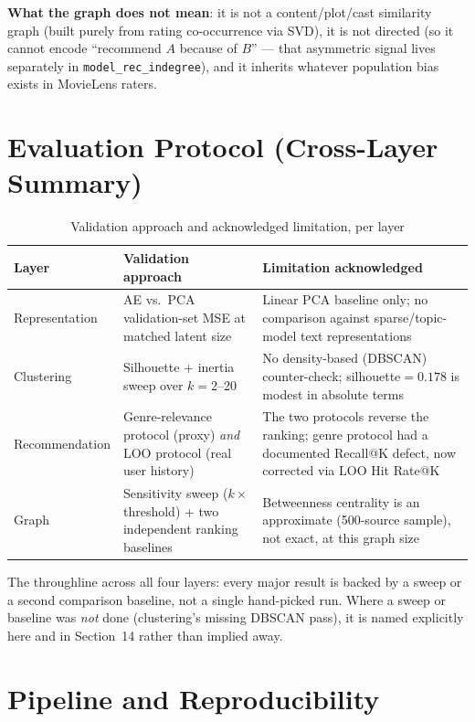\documentclass[12pt,a4paper]{article}
\begin{document}
\textbf{What the graph does not mean}: it is not a content/plot/cast similarity graph (built purely
from rating co-occurrence via SVD), it is not directed (so it cannot encode ``recommend $A$ because
of $B$'' --- that asymmetric signal lives separately in \texttt{model\_rec\_indegree}), and it
inherits whatever population bias exists in MovieLens raters.

\section{Evaluation Protocol (Cross-Layer Summary)}

\begin{table}[H]
\centering
\caption{Validation approach and acknowledged limitation, per layer}
\begin{tabular}{lp{5.3cm}p{5.3cm}}
\toprule
\textbf{Layer} & \textbf{Validation approach} & \textbf{Limitation acknowledged} \\
\midrule
Representation & AE vs.\ PCA validation-set MSE at matched latent size & Linear PCA baseline only; no comparison against sparse/topic-model text representations \\
Clustering & Silhouette + inertia sweep over $k=2$--20 & No density-based (DBSCAN) counter-check; silhouette$=0.178$ is modest in absolute terms \\
Recommendation & Genre-relevance protocol (proxy) \emph{and} LOO protocol (real user history) & The two protocols reverse the ranking; genre protocol had a documented Recall@K defect, now corrected via LOO Hit Rate@K \\
Graph & Sensitivity sweep ($k \times$ threshold) + two independent ranking baselines & Betweenness centrality is an approximate (500-source sample), not exact, at this graph size \\
\bottomrule
\end{tabular}
\end{table}

The throughline across all four layers: every major result is backed by a sweep or a second
comparison baseline, not a single hand-picked run. Where a sweep or baseline was \emph{not} done
(clustering's missing DBSCAN pass), it is named explicitly here and in Section~14 rather than
implied away.

\section{Pipeline and Reproducibility}
\end{document}
